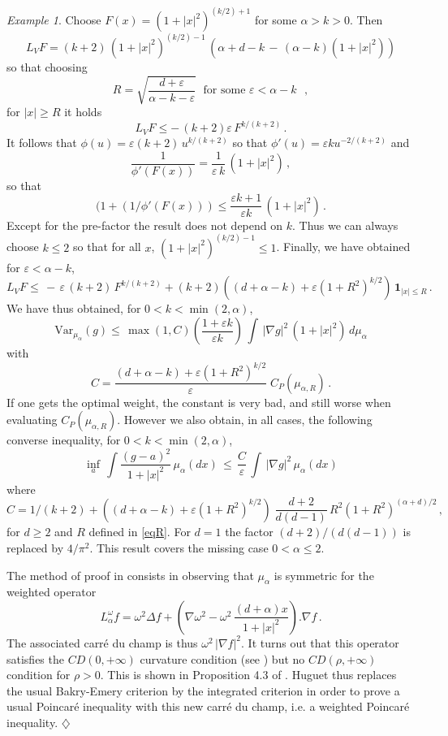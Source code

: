 \documentclass[11pt,reqno]{amsart}
\numberwithin{equation}{section}
\theoremstyle{definition}
\theoremstyle{remark}
\newtheorem{example}[theorem]{Example}
\def \Var {\textrm{Var}}
\begin{document}
\begin{example}
Choose $F(x)=(1+|x|^2)^{(k/2)+1}$ for some $\alpha>k>0$. Then $$L_VF=(k+2) \, (1+|x|^2)^{(k/2)-1} \, (\alpha+d-k \, - \, (\alpha-k)(1+|x|^2))$$ so that choosing 
\begin{equation}\label{eqR}
R=\sqrt{\frac{d+\varepsilon}{\alpha-k - \varepsilon}} \; \textrm{ for some $\varepsilon< \alpha-k$ },
\end{equation}
for $|x|\geq R$ it holds $$L_V F \leq - \, (k+2)\varepsilon \,  F^{k/(k+2)} \, .$$ It follows that $\phi(u)= \varepsilon (k+2) \, u^{k/(k+2)}$ so that $\phi'(u)= \varepsilon k u^{-2/(k+2)}$ and $$\frac{1}{\phi'(F(x))}= \frac{1}{\varepsilon \, k} \, (1+|x|^2) \, ,$$ so that $$(1+(1/\phi'(F(x)))\leq \frac{\varepsilon k + 1}{\varepsilon k} \, (1+|x|^2) \, . $$ Except for the pre-factor the result does not depend on $k$. Thus  we can always choose $k\leq 2$ so that for all $x$, $(1+|x|^2)^{(k/2)-1} \leq 1$.  Finally, we have obtained for $\varepsilon < \alpha-k$, 
$$L_V F \leq  \, -  \, \varepsilon \, (k+2)  \, F^{k/(k+2)} + (k+2)\left((d+\alpha-k)+\varepsilon (1+R^2)^{{k/2}}\right)  \, \mathbf 1_{|x|\leq R} \, .$$
We have thus obtained, for $0<k<\min(2,\alpha)$, $$\Var_{\mu_\alpha}(g) \leq  \, \max(1,C) \left(\frac{1+\varepsilon k}{\varepsilon k}\right) \, \int \, |\nabla g|^2 \, (1+|x|^2) \, d\mu_\alpha $$ with 
$$C= \frac{(d+\alpha-k)+\varepsilon (1+R^2)^{{k/2}}}{\varepsilon} \; C_P(\mu_{\alpha,R}) \, .$$
If one gets the optimal weight, the constant is very bad, and still worse when evaluating $C_P(\mu_{\alpha,R})$. However we also obtain, in all cases, the following converse inequality, for  $0<k<\min(2,\alpha)$,
\begin{equation}\label{eqcauchyconverse}
\inf_a \, \int \frac{(g-a)^2}{1+|x|^2} \, \mu_\alpha(dx) \, \leq \, \frac{C}{\varepsilon} \, \int \, |\nabla g|^2 \, \mu_\alpha(dx)
\end{equation}
where $$C= 1/{(k+2)} + ((d+\alpha-k)+\varepsilon (1+R^2)^{{k/2}}) \; \frac{d+2}{d(d-1)} \, R^2 (1+R^2)^{(\alpha+d)/2} \, ,$$ for $d\geq 2$ and $R$ defined in \eqref{eqR}. For $d=1$ the factor $(d+2)/(d(d-1))$ is replaced by $4/\pi^2$.
This result covers the missing case $0<\alpha\leq 2$. 

The method of proof in \cite{Hug} consists in observing that $\mu_\alpha$ is symmetric for the weighted operator $$L^\omega_\alpha f = \omega^2 \Delta f +\left(\nabla \omega^2-\omega^2 \, \frac{(d+\alpha)x}{1+|x|^2}\right) .\nabla f \, .$$  The associated carr\'e du champ is thus $\omega^2 \, |\nabla f|^2$. It turns out that this operator satisfies the $CD(0,+\infty)$ curvature condition (see \cite{BaGLbook}) but no $CD(\rho,+\infty)$ condition for $\rho>0$. This is shown in Proposition 4.3 of \cite{Hug}. Huguet thus replaces the usual Bakry-Emery criterion by the integrated criterion in order to prove a usual Poincar\'e inequality with this new carr\'e du champ, i.e. a weighted Poincar\'e inequality. \hfill $\diamondsuit$
\end{example}
\end{document}
